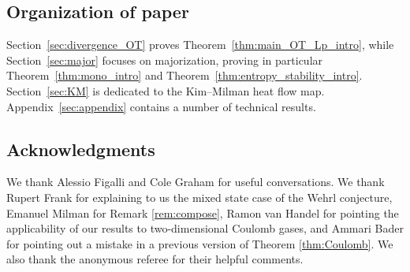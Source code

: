 \documentclass[AHL,Unicode,longabstracts]{cedram}
\begin{document}
\subsection*{Organization of paper}

Section~\ref{sec:divergence_OT} proves Theorem~\ref{thm:main_OT_Lp_intro}, while Section~\ref{sec:major} focuses on majorization, proving in particular Theorem~\ref{thm:mono_intro} and Theorem~\ref{thm:entropy_stability_intro}. Section~\ref{sec:KM} is dedicated to the Kim--Milman  heat flow map. Appendix~\ref{sec:appendix} contains a number of technical results.

\subsection*{Acknowledgments}
We thank Alessio Figalli and Cole Graham for useful conversations. We thank Rupert Frank for explaining to us the mixed state case of the Wehrl conjecture, Emanuel Milman for Remark \ref{rem:compose}, Ramon van Handel for pointing the applicability of our results to two-dimensional Coulomb gases, and Ammari Bader for pointing out a mistake in a previous version of Theorem \ref{thm:Coulomb}. We also thank the anonymous referee for their helpful comments.  
\end{document}
